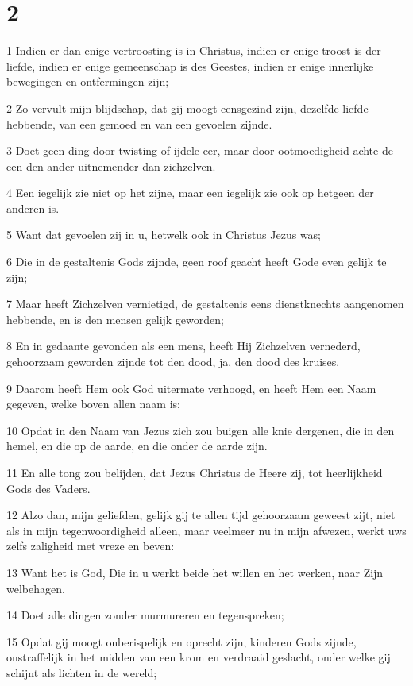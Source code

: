 \chapter{2}

\par 1 Indien er dan enige vertroosting is in Christus, indien er enige troost is der liefde, indien er enige gemeenschap is des Geestes, indien er enige innerlijke bewegingen en ontfermingen zijn;
\par 2 Zo vervult mijn blijdschap, dat gij moogt eensgezind zijn, dezelfde liefde hebbende, van een gemoed en van een gevoelen zijnde.
\par 3 Doet geen ding door twisting of ijdele eer, maar door ootmoedigheid achte de een den ander uitnemender dan zichzelven.
\par 4 Een iegelijk zie niet op het zijne, maar een iegelijk zie ook op hetgeen der anderen is.
\par 5 Want dat gevoelen zij in u, hetwelk ook in Christus Jezus was;
\par 6 Die in de gestaltenis Gods zijnde, geen roof geacht heeft Gode even gelijk te zijn;
\par 7 Maar heeft Zichzelven vernietigd, de gestaltenis eens dienstknechts aangenomen hebbende, en is den mensen gelijk geworden;
\par 8 En in gedaante gevonden als een mens, heeft Hij Zichzelven vernederd, gehoorzaam geworden zijnde tot den dood, ja, den dood des kruises.
\par 9 Daarom heeft Hem ook God uitermate verhoogd, en heeft Hem een Naam gegeven, welke boven allen naam is;
\par 10 Opdat in den Naam van Jezus zich zou buigen alle knie dergenen, die in den hemel, en die op de aarde, en die onder de aarde zijn.
\par 11 En alle tong zou belijden, dat Jezus Christus de Heere zij, tot heerlijkheid Gods des Vaders.
\par 12 Alzo dan, mijn geliefden, gelijk gij te allen tijd gehoorzaam geweest zijt, niet als in mijn tegenwoordigheid alleen, maar veelmeer nu in mijn afwezen, werkt uws zelfs zaligheid met vreze en beven:
\par 13 Want het is God, Die in u werkt beide het willen en het werken, naar Zijn welbehagen.
\par 14 Doet alle dingen zonder murmureren en tegenspreken;
\par 15 Opdat gij moogt onberispelijk en oprecht zijn, kinderen Gods zijnde, onstraffelijk in het midden van een krom en verdraaid geslacht, onder welke gij schijnt als lichten in de wereld;
